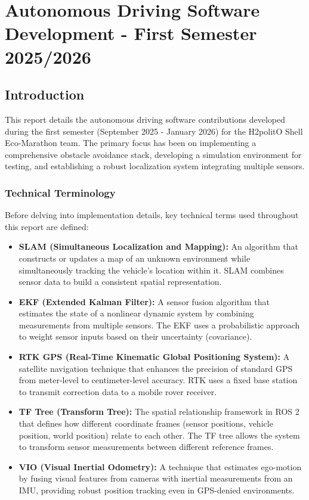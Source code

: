 
\chapter{Autonomous Driving Software Development - First Semester 2025/2026}

\section{Introduction}
This report details the autonomous driving software contributions developed during the first semester (September 2025 - January 2026) for the H2politO Shell Eco-Marathon team. The primary focus has been on implementing a comprehensive obstacle avoidance stack, developing a simulation environment for testing, and establishing a robust localization system integrating multiple sensors.

\subsection{Technical Terminology}
Before delving into implementation details, key technical terms used throughout this report are defined:

\begin{itemize}
    \item \textbf{SLAM (Simultaneous Localization and Mapping):} An algorithm that constructs or updates a map of an unknown environment while simultaneously tracking the vehicle's location within it. SLAM combines sensor data to build a consistent spatial representation.

    \item \textbf{EKF (Extended Kalman Filter):} A sensor fusion algorithm that estimates the state of a nonlinear dynamic system by combining measurements from multiple sensors. The EKF uses a probabilistic approach to weight sensor inputs based on their uncertainty (covariance).

    \item \textbf{RTK GPS (Real-Time Kinematic Global Positioning System):} A satellite navigation technique that enhances the precision of standard GPS from meter-level to centimeter-level accuracy. RTK uses a fixed base station to transmit correction data to a mobile rover receiver.

    \item \textbf{TF Tree (Transform Tree):} The spatial relationship framework in ROS 2 that defines how different coordinate frames (sensor positions, vehicle position, world position) relate to each other. The TF tree allows the system to transform sensor measurements between different reference frames.

    \item \textbf{VIO (Visual Inertial Odometry):} A technique that estimates ego-motion by fusing visual features from cameras with inertial measurements from an IMU, providing robust position tracking even in GPS-denied environments.
\end{itemize}

